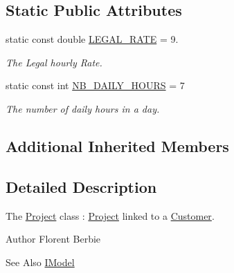 \subsection*{Static Public Attributes}
\begin{DoxyCompactItemize}
\item 
\hypertarget{classModels_1_1Project_ad3dc764849815160de77877b1e261c86}{static const double \hyperlink{classModels_1_1Project_ad3dc764849815160de77877b1e261c86}{L\-E\-G\-A\-L\-\_\-\-R\-A\-T\-E} = 9.}\label{classModels_1_1Project_ad3dc764849815160de77877b1e261c86}

\begin{DoxyCompactList}\small\item\em The Legal hourly Rate. \end{DoxyCompactList}\item 
\hypertarget{classModels_1_1Project_a2cde659bf6be8b4919d7b4b7a53c336f}{static const int \hyperlink{classModels_1_1Project_a2cde659bf6be8b4919d7b4b7a53c336f}{N\-B\-\_\-\-D\-A\-I\-L\-Y\-\_\-\-H\-O\-U\-R\-S} = 7}\label{classModels_1_1Project_a2cde659bf6be8b4919d7b4b7a53c336f}

\begin{DoxyCompactList}\small\item\em The number of daily hours in a day. \end{DoxyCompactList}\end{DoxyCompactItemize}
\subsection*{Additional Inherited Members}


\subsection{Detailed Description}
The \hyperlink{classModels_1_1Project}{Project} class \-: \hyperlink{classModels_1_1Project}{Project} linked to a \hyperlink{classModels_1_1Customer}{Customer}. 

\begin{DoxyAuthor}{Author}
Florent Berbie 
\end{DoxyAuthor}
\begin{DoxySeeAlso}{See Also}
\hyperlink{classModels_1_1IModel}{I\-Model} 
\end{DoxySeeAlso}


